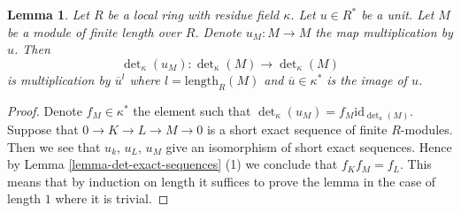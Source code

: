 \documentclass[10pt,a4paper]{amsart}
\theoremstyle{plain}
\newtheorem{lemma}[subsection]{Lemma}
\theoremstyle{definition}
\theoremstyle{remark}
\numberwithin{equation}{subsection}
\begin{document}
\begin{lemma}
\label{lemma-times-u-determinant}
Let $R$ be a local ring with residue field $\kappa$.
Let $u \in R^*$ be a unit.
Let $M$ be a module of finite length over $R$.
Denote $u_M : M \to M$ the map multiplication by $u$.
Then
$$
\det\nolimits_\kappa(u_M) :
\det\nolimits_\kappa(M)
\longrightarrow
\det\nolimits_\kappa(M)
$$
is multiplication by $\overline{u}^l$ where $l = \text{length}_R(M)$
and $\overline{u} \in \kappa^*$ is the image of $u$.
\end{lemma}

\begin{proof}
Denote $f_M \in \kappa^*$ the element such that
$\det\nolimits_\kappa(u_M) = f_M \text{id}_{\det\nolimits_\kappa(M)}$.
Suppose that $0 \to K \to L \to M \to 0$ is a short
exact sequence of finite $R$-modules. Then we see that
$u_k$, $u_L$, $u_M$ give an isomorphism of short exact sequences.
Hence by Lemma \ref{lemma-det-exact-sequences} (1) we conclude that
$f_K f_M = f_L$.
This means that by induction on length it suffices to prove the
lemma in the case of length $1$ where it is trivial.
\end{proof}
\end{document}
